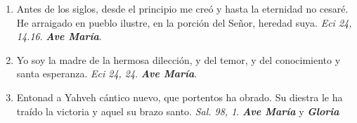 \documentclass[../../devocionario.tex]{subfiles}
\begin{document}
\begin{enumerate}
        \item Antes de los siglos, desde el principio me creó y hasta la eternidad no cesaré. He arraigado en pueblo ilustre, en la porción del Señor, heredad suya. 
            \emph{Eci 24, 14.16}. \textbf{\emph{Ave María}}.

        \item Yo soy la madre de la hermosa dilección, y del temor, y del conocimiento y santa esperanza. \emph{Eci 24, 24}. \textbf{\emph{Ave María}}.

        \item Entonad a Yahveh cántico nuevo, que portentos ha obrado. Su diestra le ha traído la victoria y aquel su brazo santo. \emph{Sal. 98, 1}. 
            \textbf{\emph{Ave María}} y \textbf{\emph{Gloria}}

    \end{enumerate}
\end{document}
